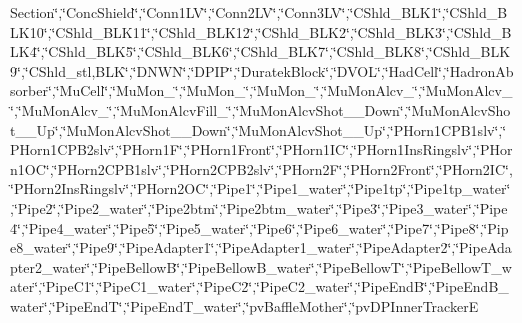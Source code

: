 \begin{DoxyCompactItemize}
Section\char`\"{},\char`\"{}Conc\-Shield\char`\"{},\char`\"{}Conn1\-L\-V\char`\"{},\char`\"{}Conn2\-L\-V\char`\"{},\char`\"{}Conn3\-L\-V\char`\"{},\char`\"{}C\-Shld\-\_\-\-B\-L\-K1\char`\"{},\char`\"{}C\-Shld\-\_\-\-B\-L\-K10\char`\"{},\char`\"{}C\-Shld\-\_\-\-B\-L\-K11\char`\"{},\char`\"{}C\-Shld\-\_\-\-B\-L\-K12\char`\"{},\char`\"{}C\-Shld\-\_\-\-B\-L\-K2\char`\"{},\char`\"{}C\-Shld\-\_\-\-B\-L\-K3\char`\"{},\char`\"{}C\-Shld\-\_\-\-B\-L\-K4\char`\"{},\char`\"{}C\-Shld\-\_\-\-B\-L\-K5\char`\"{},\char`\"{}C\-Shld\-\_\-\-B\-L\-K6\char`\"{},\char`\"{}C\-Shld\-\_\-\-B\-L\-K7\char`\"{},\char`\"{}C\-Shld\-\_\-\-B\-L\-K8\char`\"{},\char`\"{}C\-Shld\-\_\-\-B\-L\-K9\char`\"{},\char`\"{}C\-Shld\-\_\-stl,B\-L\-K\char`\"{},\char`\"{}D\-N\-W\-N\char`\"{},\char`\"{}D\-P\-I\-P\char`\"{},\char`\"{}Duratek\-Block\char`\"{},\char`\"{}D\-V\-O\-L\char`\"{},\char`\"{}Had\-Cell\char`\"{},\char`\"{}Hadron\-Absorber\char`\"{},\char`\"{}Mu\-Cell\char`\"{},\char`\"{}Mu\-Mon\-\_\char`\"{},\char`\"{}Mu\-Mon\-\_\char`\"{},\char`\"{}Mu\-Mon\-\_\char`\"{},\char`\"{}Mu\-Mon\-Alcv\-\_\char`\"{},\char`\"{}Mu\-Mon\-Alcv\-\_\char`\"{},\char`\"{}Mu\-Mon\-Alcv\-\_\char`\"{},\char`\"{}Mu\-Mon\-Alcv\-Fill\-\_\char`\"{},\char`\"{}Mu\-Mon\-Alcv\-Shot\-\_\-\_\-\-Down\char`\"{},\char`\"{}Mu\-Mon\-Alcv\-Shot\-\_\-\_\-\-Up\char`\"{},\char`\"{}Mu\-Mon\-Alcv\-Shot\-\_\-\_\-\-Down\char`\"{},\char`\"{}Mu\-Mon\-Alcv\-Shot\-\_\-\_\-\-Up\char`\"{},\char`\"{}P\-Horn1\-C\-P\-B1slv\char`\"{},\char`\"{}P\-Horn1\-C\-P\-B2slv\char`\"{},\char`\"{}P\-Horn1\-F\char`\"{},\char`\"{}P\-Horn1\-Front\char`\"{},\char`\"{}P\-Horn1\-I\-C\char`\"{},\char`\"{}P\-Horn1\-Ins\-Ringslv\char`\"{},\char`\"{}P\-Horn1\-O\-C\char`\"{},\char`\"{}P\-Horn2\-C\-P\-B1slv\char`\"{},\char`\"{}P\-Horn2\-C\-P\-B2slv\char`\"{},\char`\"{}P\-Horn2\-F\char`\"{},\char`\"{}P\-Horn2\-Front\char`\"{},\char`\"{}P\-Horn2\-I\-C\char`\"{},\char`\"{}P\-Horn2\-Ins\-Ringslv\char`\"{},\char`\"{}P\-Horn2\-O\-C\char`\"{},\char`\"{}Pipe1\char`\"{},\char`\"{}Pipe1\-\_\-water\char`\"{},\char`\"{}Pipe1tp\char`\"{},\char`\"{}Pipe1tp\-\_\-water\char`\"{},\char`\"{}Pipe2\char`\"{},\char`\"{}Pipe2\-\_\-water\char`\"{},\char`\"{}Pipe2btm\char`\"{},\char`\"{}Pipe2btm\-\_\-water\char`\"{},\char`\"{}Pipe3\char`\"{},\char`\"{}Pipe3\-\_\-water\char`\"{},\char`\"{}Pipe4\char`\"{},\char`\"{}Pipe4\-\_\-water\char`\"{},\char`\"{}Pipe5\char`\"{},\char`\"{}Pipe5\-\_\-water\char`\"{},\char`\"{}Pipe6\char`\"{},\char`\"{}Pipe6\-\_\-water\char`\"{},\char`\"{}Pipe7\char`\"{},\char`\"{}Pipe8\char`\"{},\char`\"{}Pipe8\-\_\-water\char`\"{},\char`\"{}Pipe9\char`\"{},\char`\"{}Pipe\-Adapter1\char`\"{},\char`\"{}Pipe\-Adapter1\-\_\-water\char`\"{},\char`\"{}Pipe\-Adapter2\char`\"{},\char`\"{}Pipe\-Adapter2\-\_\-water\char`\"{},\char`\"{}Pipe\-Bellow\-B\char`\"{},\char`\"{}Pipe\-Bellow\-B\-\_\-water\char`\"{},\char`\"{}Pipe\-Bellow\-T\char`\"{},\char`\"{}Pipe\-Bellow\-T\-\_\-water\char`\"{},\char`\"{}Pipe\-C1\char`\"{},\char`\"{}Pipe\-C1\-\_\-water\char`\"{},\char`\"{}Pipe\-C2\char`\"{},\char`\"{}Pipe\-C2\-\_\-water\char`\"{},\char`\"{}Pipe\-End\-B\char`\"{},\char`\"{}Pipe\-End\-B\-\_\-water\char`\"{},\char`\"{}Pipe\-End\-T\char`\"{},\char`\"{}Pipe\-End\-T\-\_\-water\char`\"{},\char`\"{}pv\-Baffle\-Mother\char`\"{},\char`\"{}pv\-D\-P\-Inner\-Tracker\-E
\end{DoxyCompactItemize}
